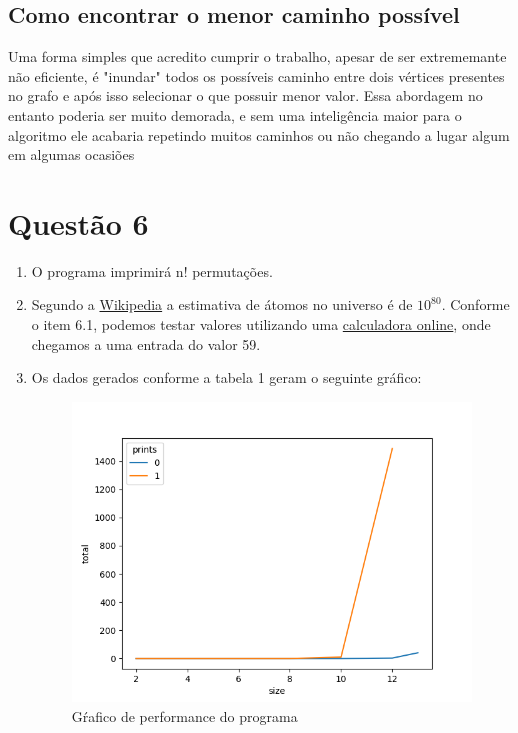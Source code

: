 \documentclass{article}
\begin{document}
\subsection{Como encontrar o menor caminho possível}
Uma forma simples que acredito cumprir o trabalho, apesar de ser extrememante não eficiente, é "inundar" todos os possíveis caminho entre dois vértices presentes no grafo e após isso selecionar o que possuir menor valor. Essa abordagem no entanto poderia ser muito demorada, e sem uma inteligência maior para o algoritmo ele acabaria repetindo muitos caminhos ou não chegando a lugar algum em algumas ocasiões
\section{Questão 6}
\begin{enumerate}
    \item O programa imprimirá n! permutações.
    \item Segundo a \href{https://pt.wikipedia.org/wiki/Universo_observ%C3%A1vel}{Wikipedia} a estimativa de átomos no universo é de {$10^{80}$}. Conforme o item 6.1, podemos testar valores utilizando uma \href{https://www.wolframalpha.com/input?i=59%21}{calculadora online}, onde chegamos a uma entrada do valor 59.
    \item
    Os dados gerados conforme a tabela 1 geram o seguinte gráfico:
    \begin{figure}[H]
        \centering
        \includegraphics[width=1\textwidth]{imgs/graph.png}
        \caption{Gŕafico de performance do programa}
        \label{fig:enter-label}
    \end{figure}

\end{enumerate}
\end{document}
